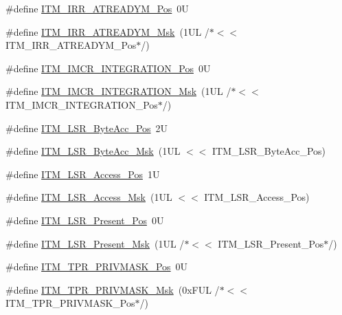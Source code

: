 \begin{DoxyCompactItemize}
\item 
\#define \hyperlink{group___c_m_s_i_s___i_t_m_ga259edfd1d2e877a62e06d7a240df97f4}{I\-T\-M\-\_\-\-I\-R\-R\-\_\-\-A\-T\-R\-E\-A\-D\-Y\-M\-\_\-\-Pos}~0\-U
\item 
\#define \hyperlink{group___c_m_s_i_s___i_t_m_ga3dbc3e15f5bde2669cd8121a1fe419b9}{I\-T\-M\-\_\-\-I\-R\-R\-\_\-\-A\-T\-R\-E\-A\-D\-Y\-M\-\_\-\-Msk}~(1\-U\-L /$\ast$$<$$<$ I\-T\-M\-\_\-\-I\-R\-R\-\_\-\-A\-T\-R\-E\-A\-D\-Y\-M\-\_\-\-Pos$\ast$/)
\item 
\#define \hyperlink{group___c_m_s_i_s___i_t_m_ga08de02bf32caf48aaa29f7c68ff5d755}{I\-T\-M\-\_\-\-I\-M\-C\-R\-\_\-\-I\-N\-T\-E\-G\-R\-A\-T\-I\-O\-N\-\_\-\-Pos}~0\-U
\item 
\#define \hyperlink{group___c_m_s_i_s___i_t_m_ga8838bd3dd04c1a6be97cd946364a3fd2}{I\-T\-M\-\_\-\-I\-M\-C\-R\-\_\-\-I\-N\-T\-E\-G\-R\-A\-T\-I\-O\-N\-\_\-\-Msk}~(1\-U\-L /$\ast$$<$$<$ I\-T\-M\-\_\-\-I\-M\-C\-R\-\_\-\-I\-N\-T\-E\-G\-R\-A\-T\-I\-O\-N\-\_\-\-Pos$\ast$/)
\item 
\#define \hyperlink{group___c_m_s_i_s___i_t_m_gabfae3e570edc8759597311ed6dfb478e}{I\-T\-M\-\_\-\-L\-S\-R\-\_\-\-Byte\-Acc\-\_\-\-Pos}~2\-U
\item 
\#define \hyperlink{group___c_m_s_i_s___i_t_m_ga91f492b2891bb8b7eac5b58de7b220f4}{I\-T\-M\-\_\-\-L\-S\-R\-\_\-\-Byte\-Acc\-\_\-\-Msk}~(1\-U\-L $<$$<$ I\-T\-M\-\_\-\-L\-S\-R\-\_\-\-Byte\-Acc\-\_\-\-Pos)
\item 
\#define \hyperlink{group___c_m_s_i_s___i_t_m_ga144a49e12b83ad9809fdd2769094fdc0}{I\-T\-M\-\_\-\-L\-S\-R\-\_\-\-Access\-\_\-\-Pos}~1\-U
\item 
\#define \hyperlink{group___c_m_s_i_s___i_t_m_gac8ae69f11c0311da226c0c8ec40b3d37}{I\-T\-M\-\_\-\-L\-S\-R\-\_\-\-Access\-\_\-\-Msk}~(1\-U\-L $<$$<$ I\-T\-M\-\_\-\-L\-S\-R\-\_\-\-Access\-\_\-\-Pos)
\item 
\#define \hyperlink{group___c_m_s_i_s___i_t_m_gaf5740689cf14564d3f3fd91299b6c88d}{I\-T\-M\-\_\-\-L\-S\-R\-\_\-\-Present\-\_\-\-Pos}~0\-U
\item 
\#define \hyperlink{group___c_m_s_i_s___i_t_m_gaa5bc2a7f5f1d69ff819531f5508bb017}{I\-T\-M\-\_\-\-L\-S\-R\-\_\-\-Present\-\_\-\-Msk}~(1\-U\-L /$\ast$$<$$<$ I\-T\-M\-\_\-\-L\-S\-R\-\_\-\-Present\-\_\-\-Pos$\ast$/)
\item 
\#define \hyperlink{group___c_m_s_i_s___i_t_m_ga7abe5e590d1611599df87a1884a352e8}{I\-T\-M\-\_\-\-T\-P\-R\-\_\-\-P\-R\-I\-V\-M\-A\-S\-K\-\_\-\-Pos}~0\-U
\item 
\#define \hyperlink{group___c_m_s_i_s___i_t_m_ga168e089d882df325a387aab3a802a46b}{I\-T\-M\-\_\-\-T\-P\-R\-\_\-\-P\-R\-I\-V\-M\-A\-S\-K\-\_\-\-Msk}~(0x\-F\-U\-L /$\ast$$<$$<$ I\-T\-M\-\_\-\-T\-P\-R\-\_\-\-P\-R\-I\-V\-M\-A\-S\-K\-\_\-\-Pos$\ast$/)

\end{DoxyCompactItemize}
